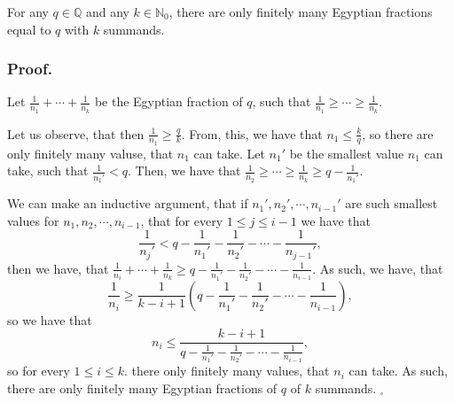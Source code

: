 \begin{theorem}\label{Egyptian fractiona finiteness theorem}
For any $q\in \mathbb{Q}$ and any $k\in \mathbb{N}_0$, there are only finitely many 
Egyptian fractions equal to $q$ with $k$ summands.
\end{theorem}
\subsubsection{Proof.}
Let $\frac{1}{n_1} + \cdots + \frac{1}{n_k}$ be the Egyptian fraction of $q$, 
such that $\frac{1}{n_1} \geq \cdots \geq \frac{1}{n_k}$.  

Let us observe, that then $\frac{1}{n_1} \geq \frac{q}{k}$. From, this, we have that 
$n_1 \leq \frac{k}{q}$, so there are only finitely many valuse, that $n_1$ can take. 
Let $n_1'$ be the smallest value $n_1$ can take, such that $\frac{1}{n_1'} < q$. 
Then, we have that $\frac{1}{n_2} \geq \cdots \geq \frac{1}{n_k} \geq q - \frac{1}{n_1'}$. 

We can make an inductive argument, that if $n_1', n_2', \cdots, n_{i-1}'$ are such 
smallest values for $n_1, n_2, \cdots, n_{i-1}$, that 
for every $1\leq j \leq i-1$ we have that 
\begin{equation}
\frac{1}{n_j'} < q - \frac{1}{n_1'} - \frac{1}{n_2'} -\cdots - \frac{1}{n_{j-1}'},
\end{equation} 
then we have, that 
$\frac{1}{n_i} + \cdots + \frac{1}{n_k} \geq q - \frac{1}{n_1'} - \frac{1}{n_2'} - 
\cdots -\frac{1}{n_{i-1}}$. 
As such, we have, that 
\begin{equation}
\frac{1}{n_i} \geq \frac{1}{k-i+1}\left(q - \frac{1}{n_1'} - \frac{1}{n_2'} - 
\cdots -\frac{1}{n_{i-1}}\right),
\end{equation}
so we have that 
\begin{equation}
n_i \leq \frac{k-i+1}{q - \frac{1}{n_1'} - \frac{1}{n_2'} - 
\cdots -\frac{1}{n_{i-1}}}, 
\end{equation}
so for every $1\leq i \leq k$. there only finitely many values, that $n_i$ can take. 
As such, there are only finitely many Egyptian fractions of $q$ of $k$ summands. $_\square$


